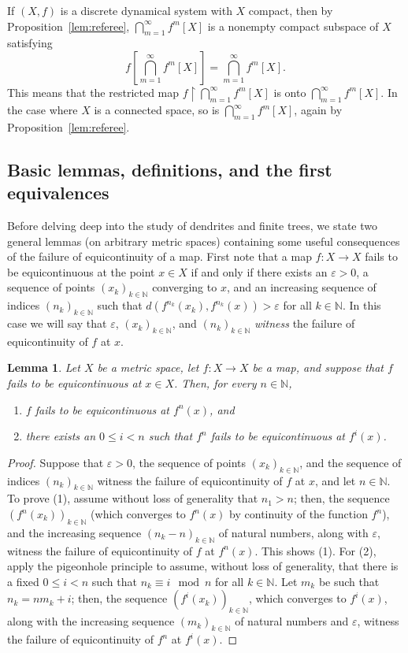 \documentclass[12pt]{amsart}
\newtheorem{lemma}[theorem]{Lemma}
\theoremstyle{definition}
\numberwithin{equation}{section}
\begin{document}
If $(X,f)$ is a discrete dynamical system with $X$ compact, then by Proposition~\ref{lem:referee}, 
$\bigcap_{m=1}^\infty f^m[X]$ is a nonempty compact subspace of $X$ satisfying 
$$
f\left[\bigcap_{m=1}^\infty f^m[X]\right]=\bigcap_{m=1}^\infty f^m[X].
$$ 
This means that the restricted map $f\upharpoonright\bigcap_{m=1}^\infty f^m[X]$ is onto $\bigcap_{m=1}^\infty f^m[X]$. In the case where $X$ is a connected space, so is $\bigcap_{m=1}^\infty f^m[X]$, again by Proposition~\ref{lem:referee}.

\subsection{Basic lemmas, definitions, and the first equivalences}

Before delving deep into the study of dendrites and finite trees, we state two general lemmas (on arbitrary metric spaces) containing some useful consequences of the failure of equicontinuity of a map. First note that a map $f \colon X\longrightarrow X$ fails to be equicontinuous at the point $x\in X$ if and only if there exists an $\varepsilon>0$, a sequence of points $(x_k)_{k\in\mathbb N}$ converging to $x$, and an increasing sequence of indices $(n_k)_{k\in\mathbb N}$ such that $d(f^{n_k}(x_k),f^{n_k}(x)) > \varepsilon$ for all 
$k\in\mathbb N$. In this case we will say that $\varepsilon$, $(x_k)_{k\in\mathbb N}$, and $(n_k)_{k\in\mathbb N}$ {\em witness} the failure of equicontinuity of $f$ at $x$.

\begin{lemma}\label{lem:f-bad-fn-bad}
Let $X$ be a metric space, let $f \colon X\longrightarrow X$ be a map, and suppose that $f$ fails to be equicontinuous at $x\in X$. Then, for every $n\in\mathbb N$, 
\begin{enumerate}
\item[\emph{(1)}] $f$ fails to be equicontinuous at $f^n(x)$, and 
\item[\emph{(2)}] there exists an $0 \leq i<n$ such that $f^n$ fails to be equicontinuous at $f^i(x)$.
\end{enumerate}
\end{lemma}
\begin{proof}
Suppose that $\varepsilon>0$, the sequence of points $(x_k)_{k\in\mathbb N}$, and the sequence of indices 
$(n_k)_{k\in\mathbb N}$ witness the failure of equicontinuity of $f$ at $x$, and let $n\in\mathbb N$. To prove (1), assume without loss of generality that $n_1>n$; then, the sequence $(f^n(x_k))_{k\in\mathbb N}$ (which converges to $f^n(x)$ by continuity of the function $f^n$), and the increasing sequence $(n_k-n)_{k\in\mathbb N}$ of natural numbers, along with $\varepsilon$, witness the failure of equicontinuity of $f$ at $f^n(x)$. This shows (1). For (2), apply the pigeonhole principle to assume, without loss of generality, that there is a fixed $0 \leq i<n$ such that $n_k\equiv i\mod n$ for all $k\in\mathbb N$. Let $m_k$ be such that $n_k=n m_k+i$; then, the sequence $(f^i(x_k))_{k\in\mathbb N}$, which converges to $f^i(x)$, along with the increasing sequence 
$(m_k)_{k\in\mathbb N}$ of natural numbers and $\varepsilon$, witness the failure of equicontinuity of $f^n$ at 
$f^i(x)$.
\end{proof}
\end{document}
